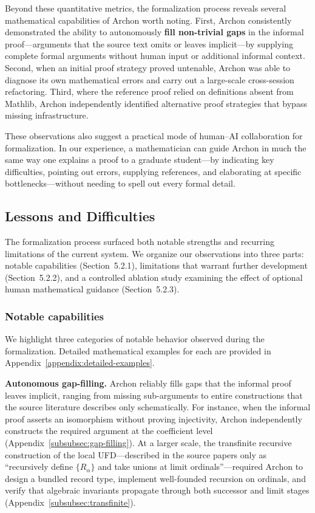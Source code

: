 \documentclass[]{pkuai4m}
\theoremstyle{plain}
\theoremstyle{definition}
\begin{document}
Beyond these quantitative metrics, the formalization process reveals several mathematical capabilities of Archon worth noting. First, Archon consistently demonstrated the ability to autonomously \textbf{fill non-trivial gaps} in the informal proof---arguments that the source text omits or leaves implicit---by supplying complete formal arguments without human input or additional informal context. Second, when an initial proof strategy proved untenable, Archon was able to diagnose its own mathematical errors and carry out a large-scale cross-session refactoring. Third, where the reference proof relied on definitions absent from Mathlib, Archon independently identified alternative proof strategies that bypass missing infrastructure.

These observations also suggest a practical mode of human--AI collaboration for formalization. In our experience, a mathematician can guide Archon in much the same way one explains a proof to a graduate student---by indicating key difficulties, pointing out errors, supplying references, and elaborating at specific bottlenecks---without needing to spell out every formal detail.



\subsection{Lessons and Difficulties}\label{subsec:lessons}

The formalization process surfaced both notable strengths and recurring limitations of the current system. We organize our observations into three parts: notable capabilities (Section~5.2.1), limitations that warrant further development (Section~5.2.2), and a controlled ablation study examining the effect of optional human mathematical guidance (Section~5.2.3).

\subsubsection{Notable capabilities}

We highlight three categories of notable behavior observed during the formalization. Detailed mathematical examples for each are provided in Appendix~\ref{appendix:detailed-examples}.

\textbf{Autonomous gap-filling.} Archon reliably fills gaps that the informal proof leaves implicit, ranging from missing sub-arguments to entire constructions that the source literature describes only schematically. For instance, when the informal proof asserts an isomorphism without proving injectivity, Archon independently constructs the required argument at the coefficient level (Appendix~\ref{subsubsec:gap-filling}). At a larger scale, the transfinite recursive construction of the local UFD---described in the source papers only as ``recursively define $\{R_\alpha\}$ and take unions at limit ordinals''---required Archon to design a bundled record type, implement well-founded recursion on ordinals, and verify that algebraic invariants propagate through both successor and limit stages (Appendix~\ref{subsubsec:transfinite}).
\end{document}
